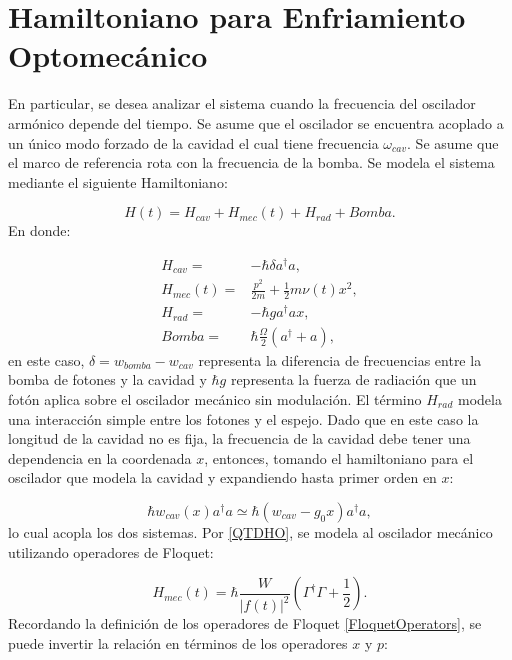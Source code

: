 \documentclass[a4paper,10pt]{report}
\begin{document}
\section{Hamiltoniano para Enfriamiento Optomecánico}

En particular, se desea analizar el sistema cuando la frecuencia del oscilador armónico depende del tiempo. Se asume que el oscilador se encuentra acoplado a un único modo forzado de la cavidad el cual tiene frecuencia $\omega_{cav}$. Se asume que el marco de referencia rota con la frecuencia de la bomba. Se modela el sistema mediante el siguiente Hamiltoniano\cite{BarberisLC}:

\begin{equation}
H(t) = H_{cav} + H_{mec}(t) + H_{rad} + Bomba.
\end{equation} En donde:

\begin{align}
H_{cav} =& -\hbar \delta a^\dagger a,\\
H_{mec}(t) =& \frac{p^2}{2m} + \frac{1}{2}m \nu (t) x^2,\\
H_{rad} =& -\hbar g a^\dagger a x,\\
Bomba =& \hbar\frac{\Omega}{2}(a^\dagger + a),
\end{align} en este caso, $\delta = w_{bomba} - w_{cav}$ representa la diferencia de frecuencias entre la bomba de fotones y la cavidad y $\hbar g$ representa la fuerza de radiación que un fotón aplica sobre el oscilador mecánico sin modulación. El término $H_{rad}$ modela una interacción simple entre los fotones y el espejo. Dado que en este caso la longitud de la cavidad no es fija, la frecuencia de la cavidad debe tener una dependencia en la coordenada $x$, entonces, tomando el hamiltoniano para el oscilador que modela la cavidad y expandiendo hasta primer orden en $x$\cite{KippenberCO}:

\begin{equation}
\hbar w_{cav}(x) a^\dagger a \simeq \hbar(w_{cav}-g_0x)a^\dagger a,
\end{equation}lo cual acopla los dos sistemas. Por \ref{QTDHO}, se modela al oscilador mecánico utilizando operadores de Floquet:

\begin{equation}
H_{mec}(t) = \hbar\frac{W}{|f(t)|^2}(\Gamma^\dagger \Gamma + \frac{1}{2}).
\end{equation} Recordando la definición de los operadores de Floquet \ref{FloquetOperators}, se puede invertir la relación en términos de los operadores $x$ y $p$:
\end{document}
